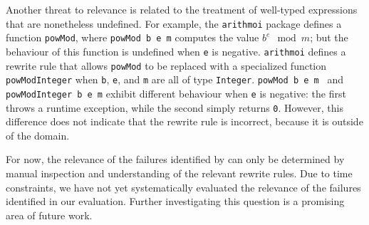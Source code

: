 Another threat to relevance is related to the treatment of well-typed
expressions that are nonetheless undefined. For example, the \texttt{arithmoi}
package defines a function \texttt{powMod}, where \texttt{powMod b e m} computes
the value $b^{e} \mod m$; but the behaviour of this function is undefined when
\texttt{e} is negative. \texttt{arithmoi} defines a rewrite rule that allows
\texttt{powMod} to be replaced with a specialized function
\texttt{powModInteger} when \texttt{b}, \texttt{e}, and \texttt{m} are all of
type \texttt{Integer}. \texttt{powMod b e m } and \texttt{powModInteger b e m}
exhibit different behaviour when \texttt{e} is negative: the first throws a
runtime exception, while the second simply returns \texttt{0}. However, this
difference does not indicate that the rewrite rule is incorrect, because it is
outside of the domain.

For now, the relevance of the failures identified by \Rulecheck can only be
determined by manual inspection and understanding of the relevant rewrite rules.
Due to time constraints, we have not yet systematically evaluated the relevance
of the failures identified in our evaluation. Further investigating this
question is a promising area of future work.
